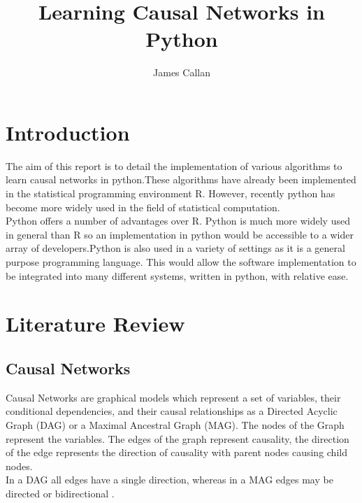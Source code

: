 \documentclass{article}
\begin{document}
\title{Learning Causal Networks in Python}
\author{James Callan}
\date{}

\maketitle

\newpage
\tableofcontents
\newpage
\section{Introduction}
The aim of this report is to detail the implementation of various algorithms to learn causal networks in python.These algorithms have already been implemented in the statistical programming environment R. However, recently python has become more widely used in the field of statistical computation.\\

Python offers a number of advantages over R. Python is much more widely used in general than R so an implementation in python would be accessible to a wider array of developers.Python is also used in a variety of settings as it is a general purpose programming language. This would allow the software implementation to be integrated into many different systems, written in python, with relative ease.\\

\section{Literature Review}

\subsection{Causal Networks}

Causal Networks are graphical models which represent a set of variables, their conditional dependencies, and their causal relationships\cite{verma1990causal} as a Directed Acyclic Graph (DAG) or a Maximal Ancestral Graph (MAG). The nodes of the Graph represent the variables. The edges of the graph represent causality, the direction of the edge represents the direction of causality with parent nodes causing child nodes\cite{verma1990causal}. 
\\

In a DAG all edges have a single direction, whereas in a MAG edges may be directed or bidirectional \cite{zhang2008causal}.
\\
\end{document}
